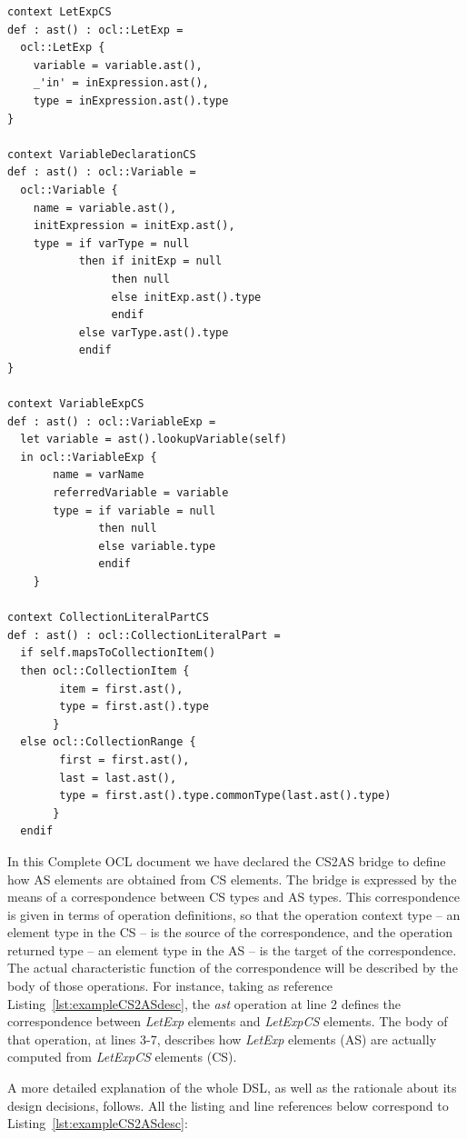 \documentclass{llncs}
\begin{document}
\begin{lstlisting}[caption=CS2AS description for running example, label=lst:exampleCS2ASdesc, language=OCL]
context LetExpCS
def : ast() : ocl::LetExp = 
  ocl::LetExp {
    variable = variable.ast(),
    _'in' = inExpression.ast(),
    type = inExpression.ast().type
}

context VariableDeclarationCS
def : ast() : ocl::Variable = 
  ocl::Variable {
    name = variable.ast(),
    initExpression = initExp.ast(),
    type = if varType = null
           then if initExp = null
                then null
                else initExp.ast().type
                endif
           else varType.ast().type
           endif
}

context VariableExpCS
def : ast() : ocl::VariableExp =
  let variable = ast().lookupVariable(self)
  in ocl::VariableExp {
       name = varName
       referredVariable = variable
       type = if variable = null
              then null
       	      else variable.type
       	      endif
   	}
  
context CollectionLiteralPartCS	
def : ast() : ocl::CollectionLiteralPart = 
  if self.mapsToCollectionItem()
  then ocl::CollectionItem {
        item = first.ast(),	
        type = first.ast().type
       }
  else ocl::CollectionRange {
        first = first.ast(),
        last = last.ast(),
        type = first.ast().type.commonType(last.ast().type)
       }
  endif
\end{lstlisting}

In this Complete OCL document we have declared the CS2AS bridge to define how AS elements are obtained from CS elements. The bridge is expressed by the means of a correspondence between CS types and AS types. This correspondence is given in terms of operation definitions, so that the operation context type -- an element type in the CS -- is the source of the correspondence, and the operation returned type -- an element type in the AS -- is the target of the correspondence. The actual characteristic function of the correspondence will be described by the body of those operations. For instance, taking as reference Listing~\ref{lst:exampleCS2ASdesc}, the \emph{ast} operation at line 2 defines the correspondence between \emph{LetExp} elements and \emph{LetExpCS} elements. The body of that operation, at lines 3-7, describes how \emph{LetExp} elements (AS) are actually computed from \emph{LetExpCS} elements (CS).

A more detailed explanation of the whole DSL, as well as the rationale about its design decisions, follows. All the listing and line references below correspond to Listing~\ref{lst:exampleCS2ASdesc}:
\end{document}
